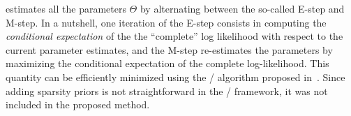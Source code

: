  estimates all the parameters $\Theta$ by alternating between the so-called E-step and M-step.
In a nutshell, one iteration of the E-step consists in computing the \textit{conditional expectation} of the the ``complete'' log likelihood with respect to the current parameter estimates,
and the M-step re-estimates the parameters by maximizing the conditional expectation of the complete log-likelihood.
This quantity can be efficiently minimized using the \EM/ algorithm proposed in~.
Since adding sparsity priors is not straightforward in the \EM/ framework, it was not included in the proposed method.


